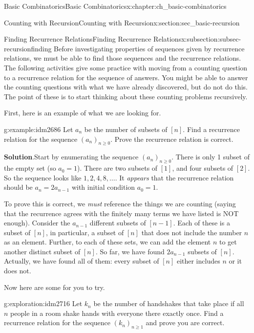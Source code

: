\documentclass[oneside,10pt,]{book}
\numberwithin{equation}{chapter}
\begin{document}
\begin{chapterptx}{Basic Combinatorics}{}{Basic Combinatorics}{}{}{x:chapter:ch_basic-combinatorics}
\begin{sectionptx}{Counting with Recursion}{}{Counting with Recursion}{}{}{x:section:sec_basic-recursion}
%
%
\typeout{************************************************}
\typeout{************************************************}
%
\begin{subsectionptx}{Finding Recurrence Relations}{}{Finding Recurrence Relations}{}{}{x:subsection:subsec-recursionfinding}
Before investigating properties of sequences given by recurrence relations, we must be able to find those sequences and the recurrence relations.  The following activities give some practice with moving from a counting question to a recurrence relation for the sequence of answers.  You might be able to answer the counting questions with what we have already discovered, but do not do this.  The point of these is to start thinking about these counting problems recursively.%
\par
First, here is an example of what we are looking for.%
\begin{example}{}{g:example:idm2686}%
Let \(a_n\) be the number of subsets of \([n]\).  Find a recurrence relation for the sequence \((a_n)_{n \ge 0}\).  Prove the recurrence relation is correct.%
\par\smallskip%
\noindent\textbf{Solution}.\hypertarget{g:solution:idm2692}{}\quad{}Start by enumerating the sequence \((a_n)_{n \ge 0}\).  There is only 1 subset of the empty set (so \(a_0 = 1\)).  There are two subsets of \([1]\), and four subsets of \([2]\).  So the sequence looks like \(1, 2, 4, 8, \ldots\).  It \emph{appears} that the recurrence relation should be \(a_n = 2a_{n-1}\) with initial condition \(a_0 = 1\).%
\par
To prove this is correct, we \emph{must} reference the things we are counting (saying that the recurrence agrees with the finitely many terms we have listed is NOT enough).  Consider the \(a_{n-1}\) different subsets of \([n-1]\).  Each of these is a subset of \([n]\), in particular, a subset of \([n]\) that does not include the number \(n\) as an element.  Further, to each of these sets, we can add the element \(n\) to get another distinct subset of \([n]\).  So far, we have found \(2a_{n-1}\) subsets of \([n]\).  Actually, we have found all of them: every subset of \([n]\) either includes \(n\) or it does not.%
\end{example}
Now here are some for you to try.%
\begin{exploration}{}{g:exploration:idm2716}%
Let \(k_n\) be the number of handshakes that take place if all \(n\) people in a room shake hands with everyone there exactly once.  Find a recurrence relation for the sequence \((k_n)_{n \ge 1}\) and prove you are correct.%

\end{exploration}
\end{subsectionptx}
\end{sectionptx}
\end{chapterptx}
\end{document}
